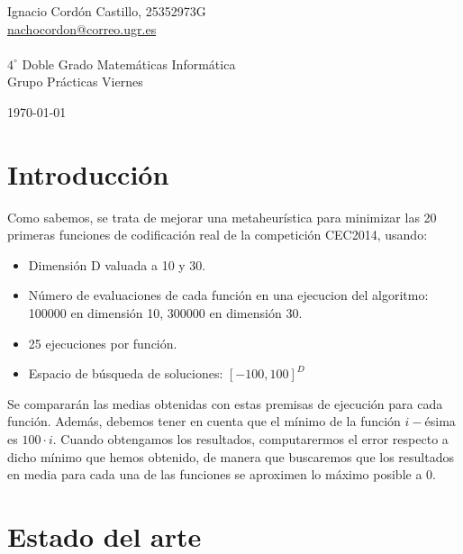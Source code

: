 \documentclass[a4paper,11pt]{article}
\newcommand{\imagent}[4]{
  \begin{figure}
    \begin{center}
    \texttt{[image: \#1]}
    \end{center}
    \caption{#3}
    \label{#4}
  \end{figure}
}
\newcommand{\imagen}[4]{
  \begin{minipage}{\linewidth}
    \centering
    \texttt{[image: \#1]}
    \captionof{figure}{#2}
    \label{#3}
  \end{minipage} 
}
\begin{document}
\begin{titlepage}
\begin{minipage}{\textwidth}
\begin{center} \large
Ignacio Cordón Castillo, 25352973G\\
\url{nachocordon@correo.ugr.es}\\
\ \\
$4^{\circ}$ Doble Grado Matemáticas Informática\\
Grupo Prácticas Viernes
\end{center}
\end{minipage}


\vspace{\fill}%
\large\today
\end{titlepage}  

\newpage
\tableofcontents
\newpage

\section{Introducción}
Como sabemos, se trata de mejorar una metaheurística para minimizar las 20 primeras funciones 
de codificación real de la competición CEC2014, usando:

\begin{itemize}
  \item Dimensión D valuada a 10 y 30.
  \item Número de evaluaciones de cada función en una ejecucion del algoritmo: 100000 en dimensión 10, 300000
  en dimensión 30.
  \item 25 ejecuciones por función.
  \item Espacio de búsqueda de soluciones: $[-100, 100]^D$
\end{itemize}

Se compararán las medias obtenidas con estas premisas de ejecución para cada función. Además, debemos tener
en cuenta que el mínimo de la función $i-$ésima es $100\cdot i$. Cuando obtengamos los resultados, computarermos
el error respecto a dicho mínimo que hemos obtenido, de manera que buscaremos que los resultados en media
para cada una de las funciones se aproximen lo máximo posible a 0.

\section{Estado del arte}
\end{document}
